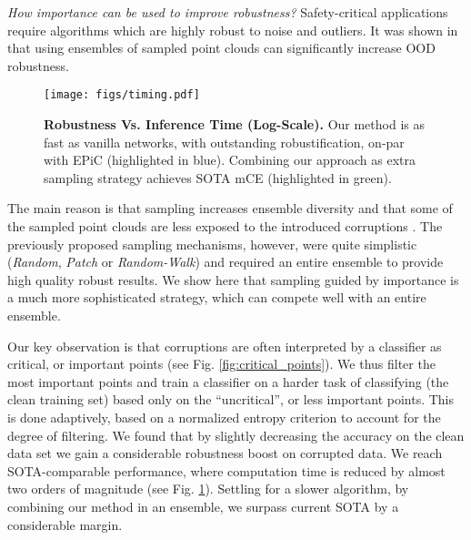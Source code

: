 \documentclass[10pt,twocolumn,letterpaper]{article}
\begin{document}
\textit{How importance can be used to improve robustness?}
Safety-critical applications require algorithms which are highly robust to noise and outliers.
It was shown in \cite{epic, point_cert, pointguard} that using ensembles of sampled point clouds can significantly increase OOD robustness. 
\begin{figure}[ptbh!]
  \centering
\texttt{[image: figs/timing.pdf]}
   \caption{{\bf Robustness Vs. Inference Time (Log-Scale).} Our method is as fast as vanilla networks, with outstanding robustification, on-par with EPiC \cite{epic} (highlighted in blue). Combining our approach as extra sampling strategy achieves SOTA mCE (highlighted in green).}
   \label{fig:timing}
\end{figure}
The main reason is that sampling increases ensemble diversity and that some of the sampled point clouds are less exposed to the introduced corruptions \cite{epic}.
The previously proposed sampling mechanisms, however, were quite simplistic (\textit{Random}, \textit{Patch} or \textit{Random-Walk}) and required an entire ensemble to provide high quality robust results.
We show here that sampling guided by importance is a much more 
sophisticated strategy, which can compete well with an entire ensemble.

Our key observation is that corruptions are often interpreted by a classifier as critical, or important points (see Fig. \ref{fig:critical_points}). We thus filter the most important points and train a classifier on a harder task of classifying (the clean training set) based only on the ``uncritical'', or less important points.
This is done adaptively, based on a normalized entropy criterion to account for the degree of filtering. We found that by slightly decreasing
the accuracy on the clean data set we gain a considerable robustness boost on corrupted data. We reach SOTA-comparable performance, where computation time is reduced by almost two orders of magnitude  (see Fig. \ref{fig:timing}).
Settling for a slower algorithm, by combining our method in an ensemble, we surpass current SOTA by a considerable margin.
\end{document}
